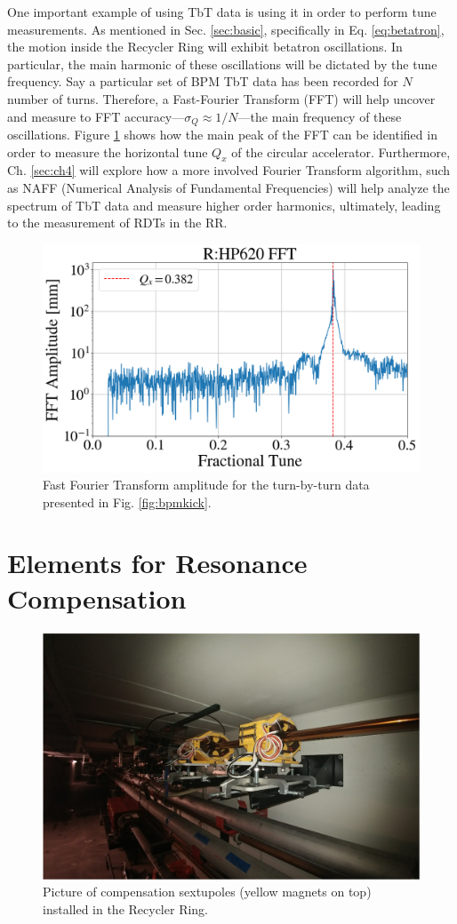 One important example of using TbT data is using it in order to perform tune measurements. As mentioned in Sec. \ref{sec:basic}, specifically in Eq. \ref{eq:betatron}, the motion inside the Recycler Ring will exhibit betatron oscillations. In particular, the main harmonic of these oscillations will be dictated by the tune frequency. Say a particular set of BPM TbT data has been recorded for $N$ number of turns. Therefore, a Fast-Fourier Transform (FFT) will help uncover and measure to FFT accuracy---$\sigma_Q\approx 1/N $---the main frequency of these oscillations. Figure \ref{fig:bpmfft} shows how the main peak of the FFT can be identified in order to measure the horizontal tune $Q_x$ of the circular accelerator. Furthermore, Ch. \ref{sec:ch4} will explore how a more involved Fourier Transform algorithm, such as NAFF (Numerical Analysis of Fundamental Frequencies) will help analyze the spectrum of TbT data and measure higher order harmonics, ultimately, leading to the measurement of RDTs in the RR.     

\begin{figure}[H]
   \centering
   \includegraphics[width=\columnwidth]{chapter3/bpm_fft.png}
   \caption{Fast Fourier Transform amplitude for the turn-by-turn data presented in Fig. \ref{fig:bpmkick}.}
   \label{fig:bpmfft}
\end{figure}

\section{Elements for Resonance Compensation}

\begin{figure}[H]
   \centering
   \includegraphics[width=\columnwidth]{chapter3/sextupoles.png}
   \caption{Picture of compensation sextupoles (yellow magnets on top) installed in the Recycler Ring.}
   \label{fig:sextupoles}
\end{figure}